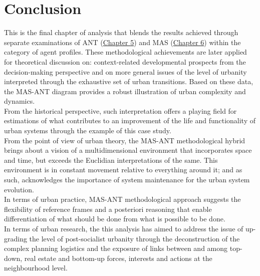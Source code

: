 \documentclass[11pt]{report}
\begin{document}
{{{\section{Conclusion}

This is the final chapter of analysis that blends the results achieved through separate examinations of ANT (\href{Chapter 5}{Chapter 5}) and MAS (\href{Chapter 6}{Chapter 6}) within the category of agent profiles.
These methodological achievements are later applied for theoretical discussion on: context-related developmental prospects from the decision-making perspective and on more general issues of the level of urbanity interpreted through the exhaustive set of urban transitions.
Based on these data, the MAS-ANT diagram provides a robust illustration of urban complexity and dynamics.
\\

From the historical perspective, such interpretation offers a playing field for estimations of what contributes to an improvement of the life and functionality of urban systems through the example of this case study.
\\

From the point of view of urban theory, the MAS-ANT methodological hybrid brings about a  vision of a multidimensional environment that incorporates space and time, but exceeds the Euclidian interpretations of the same. This environment is in constant movement relative to everything around it; and as such, acknowledges the importance of system maintenance for the urban system evolution.
\\

In terms of urban practice, MAS-ANT methodological approach suggests the flexibility of reference frames and a posteriori reasoning that enable differentiation of what should be done from what is possible to be done.
\\

In terms of urban research, the this analysis has aimed to address the issue of up- grading the level of post-socialist urbanity through the deconstruction of the complex planning logistics and the exposure of links between and among top-down, real estate and bottom-up forces, interests and actions at the neighbourhood level.
\\
 
}}}
\end{document}
